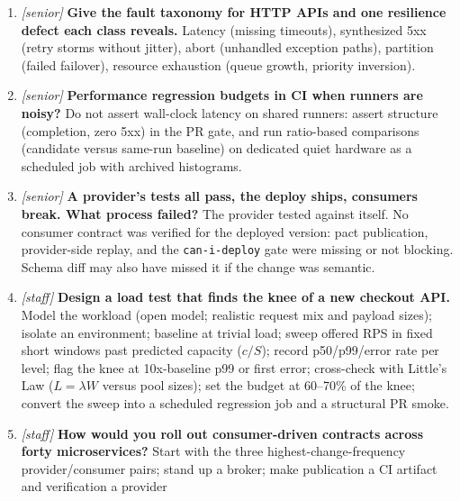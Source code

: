 \begin{enumerate}[label=\textbf{Q\arabic*.}, leftmargin=1.7cm]
{        radius.} Steady state: a measurable behavioral definition of
        ``fine'' (p99 and error rate over a window), never an internal
        proxy. Hypothesis: the system stays in steady state under a
        specified fault. Blast radius: the maximal scope the experiment can
        harm --- start at one in-process middleware, widen only as
        confidence and abort automation mature.
  \item \emph{[senior]} \textbf{Give the fault taxonomy for HTTP APIs and
        one resilience defect each class reveals.} Latency (missing
        timeouts), synthesized 5xx (retry storms without jitter), abort
        (unhandled exception paths), partition (failed failover), resource
        exhaustion (queue growth, priority inversion).
  \item \emph{[senior]} \textbf{Performance regression budgets in CI when
        runners are noisy?} Do not assert wall-clock latency on shared
        runners: assert structure (completion, zero 5xx) in the PR gate,
        and run ratio-based comparisons (candidate versus same-run
        baseline) on dedicated quiet hardware as a scheduled job with
        archived histograms.
  \item \emph{[senior]} \textbf{A provider's tests all pass, the deploy
        ships, consumers break. What process failed?} The provider tested
        against itself. No consumer contract was verified for the deployed
        version: pact publication, provider-side replay, and the
        \texttt{can-i-deploy} gate were missing or not blocking. Schema
        diff may also have missed it if the change was semantic.
  \item \emph{[staff]} \textbf{Design a load test that finds the knee of a
        new checkout API.} Model the workload (open model; realistic
        request mix and payload sizes); isolate an environment; baseline
        at trivial load; sweep offered RPS in fixed short windows past
        predicted capacity ($c/S$); record p50/p99/error rate per level;
        flag the knee at 10x-baseline p99 or first error; cross-check with
        Little's Law ($L = \lambda W$ versus pool sizes); set the budget
        at 60--70\% of the knee; convert the sweep into a scheduled
        regression job and a structural PR smoke.
  \item \emph{[staff]} \textbf{How would you roll out consumer-driven
        contracts across forty microservices?} Start with the three
        highest-change-frequency provider/consumer pairs; stand up a
        broker; make publication a CI artifact and verification a provider

\end{enumerate}
